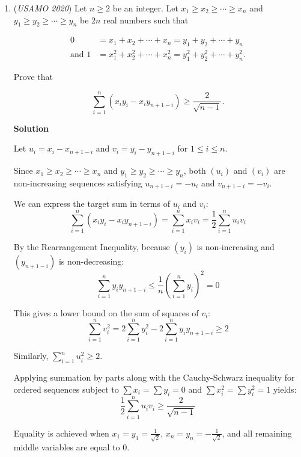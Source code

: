 \begin{enumerate}
 Claim 3: We have 
 \[m_k\leq {n-1\choose k}.\] Proof: Use induction. Note that the expression in Claim 2 is nondecreasing in $m_{k+1}$, and verify that 
 \[\frac{{n-1\choose k+1}(k+1)+{n\choose k+1}-{n-1\choose k+1}}{n-k}={n-1\choose k}.\]

 Thus, we have that the number of overdetermined subsets is at most 
 \[\sum_{k=2}^n {n-1\choose k}=2^{n-1}-n,\] as desired.

 


 


	\item (\textit{USAMO 2020}) Let $n \ge 2$ be an integer. Let $x_1 \ge x_2 \ge \cdots \ge x_n$ and $y_1 \ge y_2 \ge \cdots \ge y_n$ be $2n$ real numbers such that

 \begin{align*} 0 &= x_1 + x_2 + \cdots + x_n = y_1 + y_2 + \cdots + y_n\\ \text{and  }1 &= x_1^2+x_2^2+\cdots+x_n^2=y_1^2+y_2^2+\cdots+y_n^2. \end{align*}

Prove that

 \[\sum_{i=1}^n(x_iy_i-x_iy_{n+1-i})\ge\frac{2}{\sqrt{n-1}}.\]




\textbf{Solution}

Let $u_i = x_i - x_{n+1-i}$ and $v_i = y_i - y_{n+1-i}$ for $1 \le i \le n$. 

 Since $x_1 \ge x_2 \ge \cdots \ge x_n$ and $y_1 \ge y_2 \ge \cdots \ge y_n$, both $(u_i)$ and $(v_i)$ are non-increasing sequences satisfying $u_{n+1-i} = -u_i$ and $v_{n+1-i} = -v_i$.

 We can express the target sum in terms of $u_i$ and $v_i$:
 \[\sum_{i=1}^n (x_i y_i - x_i y_{n+1-i}) = \sum_{i=1}^n x_i v_i = \frac{1}{2} \sum_{i=1}^n u_i v_i\]

 By the Rearrangement Inequality, because $(y_i)$ is non-increasing and $(y_{n+1-i})$ is non-decreasing:
 \[\sum_{i=1}^n y_i y_{n+1-i} \le \frac{1}{n}\left(\sum_{i=1}^n y_i\right)^2 = 0\]

 This gives a lower bound on the sum of squares of $v_i$:
 \[\sum_{i=1}^n v_i^2 = 2\sum_{i=1}^n y_i^2 - 2\sum_{i=1}^n y_i y_{n+1-i} \ge 2\]

 Similarly, $\sum_{i=1}^n u_i^2 \ge 2$.

 Applying summation by parts along with the Cauchy-Schwarz inequality for ordered sequences subject to $\sum x_i = \sum y_i = 0$ and $\sum x_i^2 = \sum y_i^2 = 1$ yields:
 \[\frac{1}{2} \sum_{i=1}^n u_i v_i \ge \frac{2}{\sqrt{n-1}}\]

 Equality is achieved when $x_1 = y_1 = \frac{1}{\sqrt{2}}$, $x_n = y_n = -\frac{1}{\sqrt{2}}$, and all remaining middle variables are equal to $0$.

 


\end{enumerate}